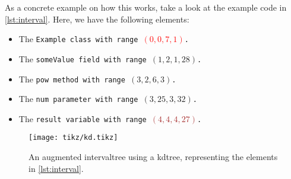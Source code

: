 \documentclass[../thesis]{subfiles}
\begin{document}
As a concrete example on how this works, take a look at the example code in \cref{lst:interval}.
Here, we have the following elements:
\begin{itemize}
	\item The \tt{Example} class with range \textcolor{red}{$(0,0,7,1)$}.
	\item The \tt{someValue} field with range \textcolor{Emerald}{$(1,2,1,28)$}.
	\item The \tt{pow} method with range \textcolor{Peach}{$(3,2,6,3)$}.
	\item The \tt{num} parameter with range \textcolor{OliveGreen}{$(3,25,3,32)$}.
	\item The \tt{result} variable with range \textcolor{Brown}{$(4,4,4,27)$}.
\end{itemize}

\begin{figure}
	\begin{center}
		\texttt{[image: tikz/kd.tikz]}
	\end{center}
	\caption{An augmented \gls{intervaltree} using a \gls{kdtree}, representing the elements in \cref{lst:interval}.}\label{fig:example_kd}
\end{figure}
\end{document}
